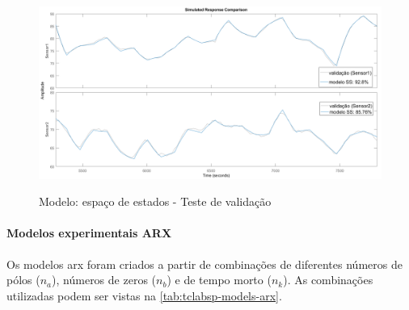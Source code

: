 \begin{figure}[h]
	\caption{Modelo: espaço de estados - Teste de validação}
	\begin{center}
		\includegraphics[width=1.00\textwidth]{./5_images/tclabsp-models-SS-compare.png} 
		\label{fig:tclabsp-models-ss-compare}
	\end{center}
	\centering
\end{figure}

\paragraph*{\textbf{Modelos experimentais ARX}}
\label{par:modelos_experimentais_arx}

Os modelos \acrshort{arx} foram criados a partir de combinações de diferentes números de pólos ($n_a$),
números de zeros ($n_b$) e de tempo morto ($n_k$). As combinações utilizadas podem ser vistas na
\cref{tab:tclabsp-models-arx}.

